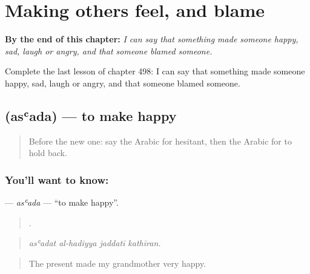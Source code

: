 
\chapter{Making others feel, and blame}
\label{ch:ar-making-others-feel-and-blame}

\begin{chapteropening}
\textbf{By the end of this chapter:} \emph{I can say that something made someone happy, sad, laugh or angry, and that someone blamed someone.}

Complete the last lesson of chapter 498: I can say that something made someone happy, sad, laugh or angry, and that someone blamed someone.
\end{chapteropening}

\section[\texorpdfstring{\ar{أسعد} (asʿada)}{أسعد (asʿada)}]{ (asʿada) — to make happy}

\label{lesson:AR-C498-asada}



\begin{quote}
Before the new one: say the Arabic for hesitant, then the Arabic for to hold back.
\end{quote}

\subsection*{You'll want to know: }
\textbf{} — \emph{asʿada} — \textquotedblleft{}to make happy\textquotedblright{}.

\begin{quote}
   .
\end{quote}

\begin{quote}
\emph{asʿadat al-hadiyya jaddatī kathīran.}
\end{quote}

\begin{quote}
The present made my grandmother very happy.
\end{quote}

